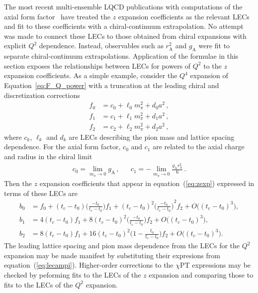 \documentclass{ar-1col}
\begin{document}
The most recent multi-ensemble LQCD publications with computations
 of the axial form factor~\cite{Park:2021ypf,RQCD:2019jai}
 have treated the $z$ expansion coefficients as the relevant LECs
 and fit to these coefficients with a chiral-continuum extrapolation.
No attempt was made to connect these LECs to those obtained
 from chiral expansions with explicit $Q^2$ dependence.
Instead, observables such as $r_{\mathrm{A}}^2$ and $g_{\mathrm{A}}$
 were fit to separate chiral-continuum extrapolations.
Application of the formulae in this section exposes the relationships
 between LECs for powers of $Q^2$ to the $z$ expansion coefficients.
 As a simple example, consider the $Q^4$ expansion of Equation~\eqref{eq:F_Q_power} with
 a truncation at the leading chiral and discretization corrections
\begin{align}
f_0 &= c_0 + \ell_0 m_\pi^2 + d_0 a^2\, ,
\nonumber\\
f_1 &= c_1 + \ell_1 m_\pi^2 + d_1 a^2\, ,
\nonumber\\
f_2 &= c_2 + \ell_2 m_\pi^2 + d_2 a^2\, ,
\label{eq:lecampi}
\end{align}
where $c_k$, $\ell_k$ and $d_k$ are LECs describing the pion mass and lattice spacing dependence.
For the axial form factor, $c_0$ and $c_1$ are related to the axial charge and radius in the chiral limit
\begin{align}
&c_0 = \lim_{m_\pi\rightarrow0} g_{\mathrm{A}}\, ,&
&c_1 = -\lim_{m_\pi\rightarrow0} \frac{g_{\mathrm{A}} r_{\mathrm{A}}^2}{6}\, .&
\end{align}
Then the $z$ expansion coefficients that appear in equation~(\ref{eq:zexp})
 expressed in terms of these LECs are
\newcommand{\tctza}{\ensuremath{(t_c-t_0)}}
\newcommand{\tctzb}{\ensuremath{\Big(\frac{-t_0}{t_c-t_0}\Big)}}
\begin{align}\label{eq:z_coeff_xpt}
b_0 &= f_0 +\tctza \tctzb f_1 +\tctza^2 \tctzb^2 f_2 +O\big(\tctza^3\big),
\nonumber\\
b_1 &= 4 \tctza f_1 +8 \tctza^2 \tctzb f_2 +O\big(\tctza^3\big),
\nonumber\\
b_2 &= 8 \tctza f_1 +16 \tctza^2 \Big(1 -\frac{t_0}{t_c-t_0}\Big) f_2 +O\big(\tctza^3\big).
\end{align}
The leading lattice spacing and pion mass dependence from
 the LECs for the $Q^2$ expansion may be made manifest
 by substituting their expresions from equation~(\ref{eq:lecampi}).
Higher-order corrections to the $\chi$PT expressions may be checked
 by peforming fits to the LECs of the $z$ expansion and comparing those
 to fits to the LECs of the $Q^2$ expansion.
\end{document}
